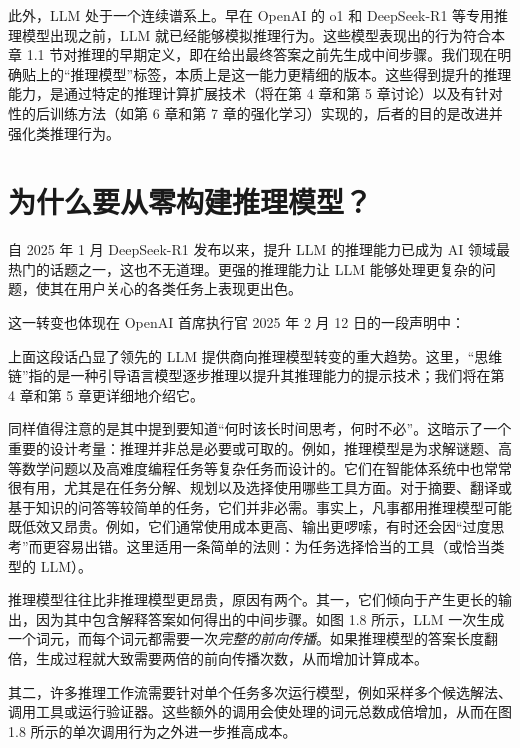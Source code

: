 此外，LLM 处于一个连续谱系上。早在 OpenAI 的 o1 和 DeepSeek-R1 等专用推理模型出现之前，LLM 就已经能够模拟推理行为。这些模型表现出的行为符合本章 1.1 节对推理的早期定义，即在给出最终答案之前先生成中间步骤。我们现在明确贴上的“推理模型”标签，本质上是这一能力更精细的版本。这些得到提升的推理能力，是通过特定的推理计算扩展技术（将在第 4 章和第 5 章讨论）以及有针对性的后训练方法（如第 6 章和第 7 章的强化学习）实现的，后者的目的是改进并强化类推理行为。

\section{为什么要从零构建推理模型？}

自 2025 年 1 月 DeepSeek-R1 发布以来，提升 LLM 的推理能力已成为 AI 领域最热门的话题之一，这也不无道理。更强的推理能力让 LLM 能够处理更复杂的问题，使其在用户关心的各类任务上表现更出色。

这一转变也体现在 OpenAI 首席执行官 2025 年 2 月 12 日的一段声明中：

上面这段话凸显了领先的 LLM 提供商向推理模型转变的重大趋势。这里，“思维链”指的是一种引导语言模型逐步推理以提升其推理能力的提示技术；我们将在第 4 章和第 5 章更详细地介绍它。

同样值得注意的是其中提到要知道“何时该长时间思考，何时不必”。这暗示了一个重要的设计考量：推理并非总是必要或可取的。例如，推理模型是为求解谜题、高等数学问题以及高难度编程任务等复杂任务而设计的。它们在智能体系统中也常常很有用，尤其是在任务分解、规划以及选择使用哪些工具方面。对于摘要、翻译或基于知识的问答等较简单的任务，它们并非必需。事实上，凡事都用推理模型可能既低效又昂贵。例如，它们通常使用成本更高、输出更啰嗦，有时还会因“过度思考”而更容易出错。这里适用一条简单的法则：为任务选择恰当的工具（或恰当类型的 LLM）。

推理模型往往比非推理模型更昂贵，原因有两个。其一，它们倾向于产生更长的输出，因为其中包含解释答案如何得出的中间步骤。如图 1.8 所示，LLM 一次生成一个词元，而每个词元都需要一次\emph{完整的前向传播}。如果推理模型的答案长度翻倍，生成过程就大致需要两倍的前向传播次数，从而增加计算成本。


其二，许多推理工作流需要针对单个任务多次运行模型，例如采样多个候选解法、调用工具或运行验证器。这些额外的调用会使处理的词元总数成倍增加，从而在图 1.8 所示的单次调用行为之外进一步推高成本。

